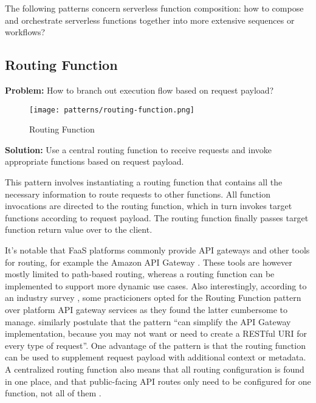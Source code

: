 The following patterns concern serverless function composition: how to compose and orchestrate serverless functions together into more extensive sequences or workflows?

\subsection{Routing Function} \label{subsec:routingFunction}

\textbf{Problem:} How to branch out execution flow based on request payload?

\begin{figure}[h]
  \centering
  \texttt{[image: patterns/routing-function.png]}
  \caption{Routing Function}
  \label{fig:patternRoutingFunction}
\end{figure}

\textbf{Solution:} Use a central routing function to receive requests and invoke appropriate functions based on request payload.

This pattern involves instantiating a routing function that contains all the necessary information to route requests to other functions. All function invocations are directed to the routing function, which in turn invokes target functions according to request payload. The routing function finally passes target function return value over to the client.

It's notable that FaaS platforms commonly provide API gateways and other tools for routing, for example the Amazon API Gateway \parencite{awslambda0218}. These tools are however mostly limited to path-based routing, whereas a routing function can be implemented to support more dynamic use cases. Also interestingly, according to an industry survey \parencite{leitner18industrialpractice}, some practicioners opted for the Routing Function pattern over platform API gateway services as they found the latter cumbersome to manage. \textcite{sbarski2017serverless} similarly postulate that the pattern ``can simplify the API Gateway implementation, because you may not want or need to create a RESTful URI for every type of request''. One advantage of the pattern is that the routing function can be used to supplement request payload with additional context or metadata. A centralized routing function also means that all routing configuration is found in one place, and that public-facing API routes only need to be configured for one function, not all of them \parencite{leitner18industrialpractice}.

